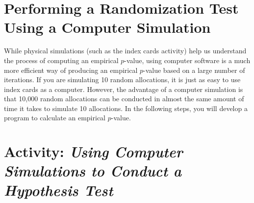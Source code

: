 \documentclass[
]{report}
\begin{document}
\hypertarget{performing-a-randomization-test-using-a-computer-simulation}{%
\section{\texorpdfstring{\textbf{Performing a Randomization Test Using a Computer Simulation}}{Performing a Randomization Test Using a Computer Simulation}}\label{performing-a-randomization-test-using-a-computer-simulation}}

While physical simulations (such as the index cards activity) help us understand the process of computing an empirical \(p\)-value, using computer software is a much more efficient way of producing an empirical \(p\)-value based on a large number of iterations. If you are simulating 10 random allocations, it is just as easy to use index cards as a computer. However, the advantage of a computer simulation is that 10,000 random allocations can be conducted in almost the same amount of time it takes to simulate 10 allocations. In the following steps, you will develop a program to calculate an empirical \(p\)-value.

\hypertarget{activity-using-computer-simulations-to-conduct-a-hypothesis-test}{%
\section*{\texorpdfstring{Activity: \emph{Using Computer Simulations to Conduct a Hypothesis Test}}{Activity: Using Computer Simulations to Conduct a Hypothesis Test}}\label{activity-using-computer-simulations-to-conduct-a-hypothesis-test}}
\end{document}
